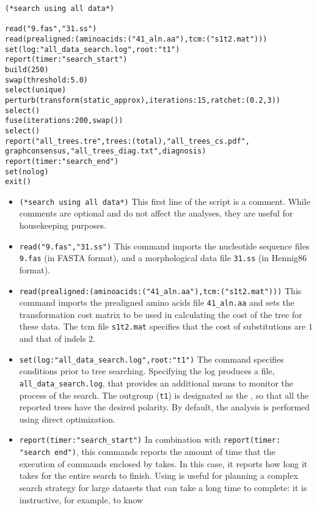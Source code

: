\begin{verbatim}
(*search using all data*)

read("9.fas","31.ss")
read(prealigned:(aminoacids:("41_aln.aa"),tcm:("s1t2.mat")))
set(log:"all_data_search.log",root:"t1")
report(timer:"search_start")
build(250)
swap(threshold:5.0)
select(unique)
perturb(transform(static_approx),iterations:15,ratchet:(0.2,3))
select()
fuse(iterations:200,swap())
select()
report("all_trees.tre",trees:(total),"all_trees_cs.pdf",
graphconsensus,"all_trees_diag.txt",diagnosis)
report(timer:"search_end")
set(nolog)
exit()
\end{verbatim}

\begin{itemize}
\item \texttt{(*search using all data*)} This first line of the script is a comment. While comments are optional 
and do not affect the analyses, they are useful for housekeeping purposes.
\item \texttt{read("9.fas","31.ss")} This command imports the nucleotide sequence files \texttt{9.fas} (in FASTA 
format), and a morphological data file \texttt{31.ss} (in Hennig86 format).
\item \texttt{read(prealigned:(aminoacids:("41\_aln.aa"),tcm:("s1t2.mat")))} This command imports the prealigned
amino acids file \texttt{41\_aln.aa} and sets the transformation cost matrix to be used in calculating the cost of the tree
for these data.  The tcm file \texttt{s1t2.mat} specifies that the cost of substitutions are $1$ and that of indels $2$.
\item \texttt{set(log:"all\_data\_search.log",root:"t1")} The  command specifies 
conditions prior to tree searching. Specifying the log 
produces a file, \texttt{all\_data\_search.log}, that provides an additional means to monitor the process 
of the search. The outgroup (\texttt{t1}) is designated as the , so that all the 
reported trees have the desired polarity. By default, the analysis is performed using direct optimization.
\item \texttt{report(timer:"search\_start")} In combination with \texttt{report(timer:\\"search end")}, this commands 
reports the amount of time that the execution of commands enclosed by  takes. In this 
case, it reports how long it takes for the entire search to finish. Using  is useful for planning a complex 
search strategy for large datasets that can take a long time to complete: it is instructive, for example, to know 

\end{itemize}
